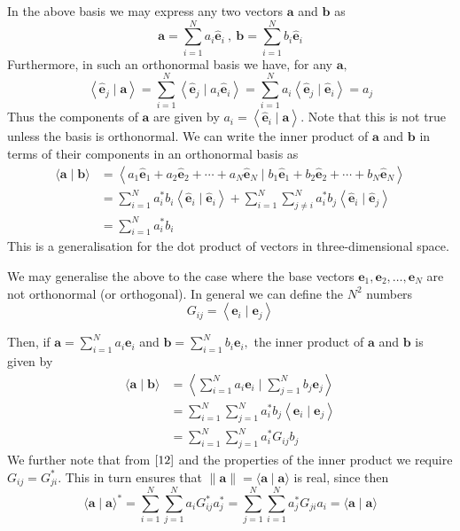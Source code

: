 \documentclass[12pt]{book}
\theoremstyle{definition}\newtheorem{dfn}{Définition}[chapter]
\theoremstyle{plain}\newtheorem{thm}{Théorème}[chapter]
\theoremstyle{plain}\newtheorem{prp}{Proposition}[chapter]
\theoremstyle{plain}\newtheorem{lem}{\bf Lemme}[chapter]
\theoremstyle{plain}\newtheorem{axm}{\bf Axiome}[chapter]
\theoremstyle{plain}\newtheorem{lmm}{\bf Lemme}[chapter]
\theoremstyle{plain}\newtheorem{cor}{\bf Corollaire}[chapter]
\theoremstyle{remark}\newtheorem{rem}{Remarque}[chapter]
\begin{document}
In the above basis we may express any two vectors $\mathbf{a}$ and $\mathbf{b}$ as
$$
\mathbf{a}=\sum_{i=1}^{N} a_{i} \hat{\mathbf{e}}_{i}\ ,\  \mathbf{b}=\sum_{i=1}^{N} b_{i} \hat{\mathbf{e}}_{i}
$$
Furthermore, in such an orthonormal basis we have, for any $\mathbf{a},$
\begin{equation}
\left\langle\hat{\mathbf{e}}_{j} \mid \mathbf{a}\right\rangle=\sum_{i=1}^{N}\left\langle\hat{\mathbf{e}}_{j} \mid a_{i} \hat{\mathbf{e}}_{i}\right\rangle=\sum_{i=1}^{N} a_{i}\left\langle\hat{\mathbf{e}}_{j} \mid \hat{\mathbf{e}}_{i}\right\rangle=a_{j}\label{13}
\end{equation}
Thus the components of $\mathbf{a}$ are given by $a_{i}=\left\langle\hat{\mathbf{e}}_{i} \mid \mathbf{a}\right\rangle .$ Note that this is not true unless the basis is orthonormal. We can write the inner product of $\mathbf{a}$ and $\mathbf{b}$ in terms of their components in an orthonormal basis as
$$
\begin{aligned}
\langle\mathbf{a} \mid \mathbf{b}\rangle &=\left\langle a_{1} \hat{\mathbf{e}}_{1}+a_{2} \hat{\mathbf{e}}_{2}+\cdots+a_{N} \hat{\mathbf{e}}_{N} \mid b_{1} \hat{\mathbf{e}}_{1}+b_{2} \hat{\mathbf{e}}_{2}+\cdots+b_{N} \hat{\mathbf{e}}_{N}\right\rangle \\
&=\sum_{i=1}^{N} a_{i}^{*} b_{i}\left\langle\hat{\mathbf{e}}_{i} \mid \hat{\mathbf{e}}_{i}\right\rangle+\sum_{i=1}^{N} \sum_{j \neq i}^{N} a_{i}^{*} b_{j}\left\langle\hat{\mathbf{e}}_{i} \mid \hat{\mathbf{e}}_{j}\right\rangle \\
&=\sum_{i=1}^{N} a_{i}^{*} b_{i}
\end{aligned}
$$
This is a generalisation for the dot product of vectors in three-dimensional space.

We may generalise the above to the case where the base vectors $\mathbf{e}_{1}, \mathbf{e}_{2}, \ldots, \mathbf{e}_{N}$ are not orthonormal (or orthogonal). In general we can define the $N^{2}$ numbers
\begin{equation}
G_{ij}=\left\langle\mathbf{e}_{i} \mid \mathbf{e}_{j}\right\rangle\label{12}
\end{equation}

Then, if $\mathbf{a}=\sum_{i=1}^{N} a_{i} \mathbf{e}_{i}$ and $\mathbf{b}=\sum_{i=1}^{N} b_{i} \mathbf{e}_{i},$ the inner product of $\mathbf{a}$ and $\mathbf{b}$ is given by
$$
\begin{aligned}
\langle\mathbf{a} \mid \mathbf{b}\rangle &=\left\langle\sum_{i=1}^{N} a_{i} \mathbf{e}_{i} \mid \sum_{j=1}^{N} b_{j} \mathbf{e}_{j}\right\rangle \\
&=\sum_{i=1}^{N} \sum_{j=1}^{N} a_{i}^{*} b_{j}\left\langle\mathbf{e}_{i} \mid \mathbf{e}_{j}\right\rangle \\
&=\sum_{i=1}^{N} \sum_{j=1}^{N} a_{i}^{*} G_{i j} b_{j}
\end{aligned}
$$
We further note that from $\ref{12}$ and the properties of the inner product we require $G_{i j}=G_{j i}^{*} .$ This in turn ensures that $\|\mathbf{a}\|=\langle\mathbf{a} \mid \mathbf{a}\rangle$ is real, since then
$$
\langle\mathbf{a} \mid \mathbf{a}\rangle^{*}=\sum_{i=1}^{N} \sum_{j=1}^{N} a_{i} G_{i j}^{*} a_{j}^{*}=\sum_{j=1}^{N} \sum_{i=1}^{N} a_{j}^{*} G_{j i} a_{i}=\langle\mathbf{a} \mid \mathbf{a}\rangle
$$
\end{document}

